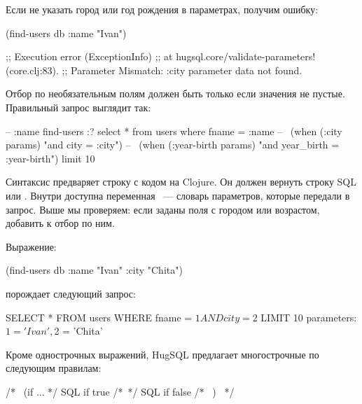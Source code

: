 Если не указать город или год рождения в параметрах, получим ошибку:

\begin{english}
  \begin{clojure}
(find-users db {:name "Ivan"})

;; Execution error (ExceptionInfo)
;; at hugsql.core/validate-parameters! (core.clj:83).
;; Parameter Mismatch: :city parameter data not found.
  \end{clojure}
\end{english}

Отбор по необязательным полям должен быть только если значения не пустые. Правильный запрос выглядит так:

\begin{english}
  \begin{sql}
-- :name find-users :?
select * from users
where fname = :name
--~ (when (:city params) "and city = :city")
--~ (when (:year-birth params) "and year_birth = :year-birth")
limit 10
  \end{sql}
\end{english}

Синтаксис \code{--~} предваряет строку с кодом на Clojure. Он должен вернуть строку SQL или . Внутри доступна переменная ~--- словарь параметров, которые передали в запрос. Выше мы проверяем: если заданы поля с городом или возрастом, добавить к  отбор по ним.

Выражение:

\begin{english}
  \begin{clojure}
(find-users db {:name "Ivan" :city "Chita"})
  \end{clojure}
\end{english}

порождает следующий запрос:

\begin{english}
  \begin{sql}
SELECT * FROM users
WHERE fname = $1
  AND city = $2
LIMIT 10
parameters: $1 = 'Ivan', $2 = 'Chita'
  \end{sql}
\end{english}

Кроме однострочных выражений, HugSQL предлагает многострочные по следующим правилам:

\begin{english}
  \begin{sql}
/*~ (if ... */
SQL if true
/*~*/
SQL if false
/*~ ) ~*/
  \end{sql}
\end{english}


